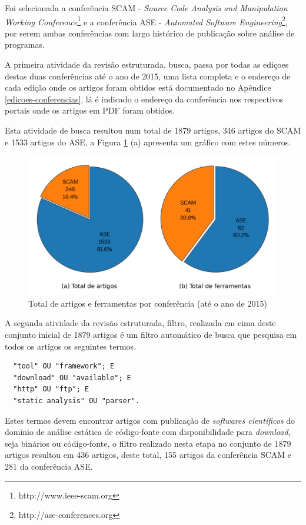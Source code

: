 Foi selecionada a conferência SCAM - {\it Source Code Analysis and Manipulation Working
Conference}\footnote{http://www.ieee-scam.org} e a conferência ASE - {\it Automated
Software Engineering}\footnote{http://ase-conferences.org}, por serem ambas
conferências com largo histórico de publicação sobre análise de programas.

A primeira atividade da revisão estruturada, busca, passa por todas as ediçoes
destas duas conferências até o ano de 2015, uma lista completa e o endereço de
cada edição onde os artigos foram obtidos está documentado no Apêndice
\ref{edicoes-conferencias}, lá é indicado o endereço da conferência nos
respectivos portais onde os artigos em PDF foram obtidos.

Esta atividade de busca resultou num total de 1879 artigos, 346 artigos do SCAM
e 1533 artigos do ASE, a Figura \ref{grafico-total-artigos} (a) apresenta um
gráfico com estes números.

\begin{figure}[H]
  \center
  \includegraphics[scale=0.9]{imagens/total-artigos-e-ferramentas.png}
  \caption{Total de artigos e ferramentas por conferência (até o ano de 2015)}
  \label{grafico-total-artigos}
\end{figure}

A segunda atividade da revisão estruturada, filtro, realizada em cima deste conjunto
inicial de 1879 artigos é um filtro automático de busca que pesquisa em todos
os artigos os seguintes termos.

\begin{verbatim}
  "tool" OU "framework"; E
  "download" OU "available"; E
  "http" OU "ftp"; E
  "static analysis" OU "parser".
\end{verbatim}

Estes termos devem encontrar artigos com publicação de {\it softwares
científicos} do domínio de análise estática de código-fonte com disponibilidade
para {\it download}, seja binários ou código-fonte, o filtro realizado nesta
etapa no conjunto de 1879 artigos resultou em 436 artigos, deste total,
155 artigos da conferência SCAM e 281 da conferência ASE.

